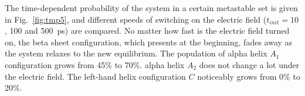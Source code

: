 \documentclass[aip,jcp,a4paper,preprint,onecolumn]{revtex4-1}
\begin{document}


The time-dependent probability of the system in a certain metastable set is given in
Fig.~\ref{fig:tmp5}, and different speeds of switching on the electric field
($t_{init} = 10$, 100 and 500~ps) are compared.  No matter how fast is the electric field turned
on, the beta sheet configuration, which presents at the beginning,
fades away as the system relaxes to the new equilibrium. The
population of alpha helix $A_1$ configuration grows from 45\% to 70\%.
alpha helix $A_2$  does not change a lot under the electric field.
The left-hand helix configuration $C$ noticeably grows from 0\% to 20\%.
\end{document}
